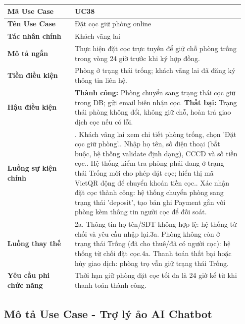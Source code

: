 \documentclass[a4paper,oneside]{report}
\begin{document}
\begin{longtable}[]{@{}>{\RaggedRight\arraybackslash}p{0.27\linewidth}>{\RaggedRight\arraybackslash}p{0.68\linewidth}@{}}
\toprule
\textbf{Mã Use Case} & UC38\tabularnewline
\midrule
\endhead
\textbf{Tên Use Case} & Đặt cọc giữ phòng online\tabularnewline
\textbf{Tác nhân chính} & Khách vãng lai\tabularnewline
\textbf{Mô tả ngắn} & Thực hiện đặt cọc trực tuyến để giữ chỗ phòng
trống trong vòng 24 giờ trước khi ký hợp đồng.\tabularnewline
\textbf{Tiền điều kiện} & Phòng ở trạng thái trống; khách vãng lai đã
đăng ký thông tin liên hệ.\tabularnewline
\textbf{Hậu điều kiện} & \textbf{Thành công:} Phòng chuyển sang trạng thái cọc giữ trong DB; gửi email biên nhận cọc.\newline 
\textbf{Thất bại:} Trạng thái phòng không đổi, không giữ chỗ, hoàn trả giao dịch cọc nếu có lỗi.\tabularnewline
\textbf{Luồng sự kiện chính} & 1. Khách vãng lai xem
chi tiết phòng trống, chọn 'Đặt cọc giữ phòng'.\newline 2. Nhập họ
tên, số điện thoại (bắt buộc, hệ thống validate định dạng), CCCD và số
tiền cọc.\newline 3. Hệ thống kiểm tra phòng phải đang ở trạng thái
Trống mới cho phép đặt cọc; hiển thị mã VietQR động để chuyển khoản tiền
cọc.\newline 4. Xác nhận đặt cọc thành công: hệ thống chuyển phòng
sang trạng thái 'deposit', tạo bản ghi Payment gắn với phòng kèm thông
tin người cọc để đối soát.\tabularnewline
\textbf{Luồng thay thế} & 2a. Thông tin họ tên/SĐT
không hợp lệ: hệ thống từ chối và yêu cầu nhập lại.\newline 3a.
Phòng không còn ở trạng thái Trống (đã cho thuê/đã có người cọc): hệ
thống từ chối đặt cọc.\newline 4a. Thanh toán thất bại hoặc hủy
giao dịch: phòng trọ vẫn giữ trạng thái Trống.\tabularnewline
\textbf{Yêu cầu phi chức năng} & Thời hạn giữ phòng đặt cọc tối đa là 24
giờ kể từ khi thanh toán thành công.\tabularnewline
\bottomrule
\end{longtable}

\subsection{Mô tả Use Case - Trợ lý ảo AI Chatbot}
\end{document}
